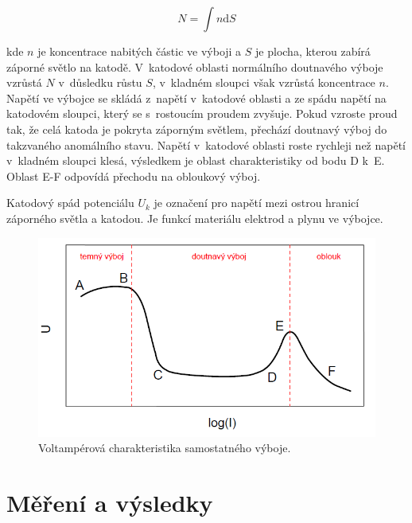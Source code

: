 \documentclass[a4paper,12pt]{article}
\begin{document}
\begin{equation}
	N = \int n \text{d}S
	\label{10}
\end{equation}

kde $n$ je koncentrace nabitých částic ve výboji a $S$ je plocha, kterou zabírá záporné světlo na katodě. V~katodové oblasti normálního doutnavého výboje vzrůstá $N$ v~důsledku růstu $S$, v~kladném sloupci však vzrůstá koncentrace $n$. Napětí ve výbojce se skládá z~napětí v~katodové oblasti a ze spádu napětí na katodovém sloupci, který se s~rostoucím proudem zvyšuje. Pokud vzroste proud tak, že celá katoda je pokryta záporným světlem, přechází doutnavý výboj do takzvaného anomálního stavu. Napětí v~katodové oblasti roste rychleji než napětí v~kladném sloupci klesá, výsledkem je oblast charakteristiky od bodu D k~E. Oblast E-F odpovídá přechodu na obloukový výboj.

Katodový spád potenciálu $U_k$ je označení pro napětí mezi ostrou hranicí záporného světla a katodou. Je funkcí materiálu elektrod a plynu ve výbojce. 

\begin{figure}[h]
	\centering
	\includegraphics[width=130mm]{VA.png}
	\caption{Voltampérová charakteristika samostatného výboje.}
	\label{VA}
\end{figure}




\section{Měření a výsledky}
\end{document}
